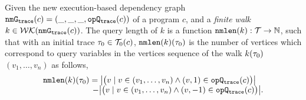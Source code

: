 \begin{enumerate}
{\begin{defn}
 \label{def:NMlen}
 Given 
 the new execution-based dependency graph $\mathtt{nmG_{trace}}({c}) = (\_, \_, \_, \mathtt{opQ_{trace}}({c}))$ of a program $c$,
 and a \emph{finite walk} 
 $k \in \mathcal{WK}(\mathtt{nmG_{trace}}(c))$. 
 The query length of $k$ is a function $\mathtt{nmlen}(k): \mathcal{T} \to \mathbb{N}$, such that with an initial trace $\mathtt{\tau}_0 \in \mathcal{T}_0(c)$, $\mathtt{nmlen}(k)(\mathtt{\tau}_0)$ is
 the number of vertices which correspond to query variables in the vertices sequence of the walk $k(\mathtt{\tau}_0)$
 $(v_1, \ldots, v_{n})$ as follows, 
 \[
     \begin{array}{l}
        \NMlen(k)(\trace_0) = 
        \left\vert \big( v \mid v \in (v_1, \ldots, v_{n}) \land (v, 1) \in \traceOP(c) \big) \right \vert
        \\ \qquad \qquad \qquad
        - 
        \left\vert \big( v \mid v \in (v_1, \ldots, v_{n}) \land (v, -1) \in \traceOP(c) \big) \right \vert.
    \end{array}
 \]
 \end{defn}}
\end{enumerate}
